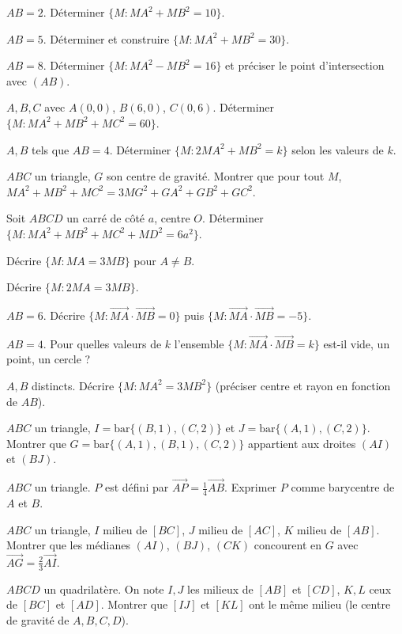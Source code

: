 \exo{} $AB=2$. Déterminer $\{M:MA^2+MB^2=10\}$.

\exo{} $AB=5$. Déterminer et construire $\{M:MA^2+MB^2=30\}$.

\exo{} $AB=8$. Déterminer $\{M:MA^2-MB^2=16\}$ et préciser le point d'intersection avec $(AB)$.

\exo{} $A,B,C$ avec $A(0,0)$, $B(6,0)$, $C(0,6)$. Déterminer $\{M:MA^2+MB^2+MC^2=60\}$.

\exo{} $A,B$ tels que $AB=4$. Déterminer $\{M:2MA^2+MB^2=k\}$ selon les valeurs de $k$.

\exo{} $ABC$ un triangle, $G$ son centre de gravité. Montrer que pour tout $M$, $MA^2+MB^2+MC^2=3MG^2+GA^2+GB^2+GC^2$.

\exo{} Soit $ABCD$ un carré de côté $a$, centre $O$. Déterminer $\{M:MA^2+MB^2+MC^2+MD^2=6a^2\}$.

\exo{} Décrire $\{M:MA=3MB\}$ pour $A\neq B$.

\exo{} Décrire $\{M:2MA=3MB\}$.

\exo{} $AB=6$. Décrire $\{M:\overrightarrow{MA}\cdot\overrightarrow{MB}=0\}$ puis $\{M:\overrightarrow{MA}\cdot\overrightarrow{MB}=-5\}$.

\exo{} $AB=4$. Pour quelles valeurs de $k$ l'ensemble $\{M:\overrightarrow{MA}\cdot\overrightarrow{MB}=k\}$ est-il vide, un point, un cercle ?

\exo{} $A,B$ distincts. Décrire $\{M:MA^2=3MB^2\}$ (préciser centre et rayon en fonction de $AB$).

\exo{} $ABC$ un triangle, $I=\mathrm{bar}\{(B,1),(C,2)\}$ et $J=\mathrm{bar}\{(A,1),(C,2)\}$. Montrer que $G=\mathrm{bar}\{(A,1),(B,1),(C,2)\}$ appartient aux droites $(AI)$ et $(BJ)$.

\exo{} $ABC$ un triangle. $P$ est défini par $\overrightarrow{AP}=\frac14\overrightarrow{AB}$. Exprimer $P$ comme barycentre de $A$ et $B$.

\exo{} $ABC$ un triangle, $I$ milieu de $[BC]$, $J$ milieu de $[AC]$, $K$ milieu de $[AB]$. Montrer que les médianes $(AI)$, $(BJ)$, $(CK)$ concourent en $G$ avec $\overrightarrow{AG}=\frac23\overrightarrow{AI}$.

\exo{} $ABCD$ un quadrilatère. On note $I,J$ les milieux de $[AB]$ et $[CD]$, $K,L$ ceux de $[BC]$ et $[AD]$. Montrer que $[IJ]$ et $[KL]$ ont le même milieu (le centre de gravité de $A,B,C,D$).

